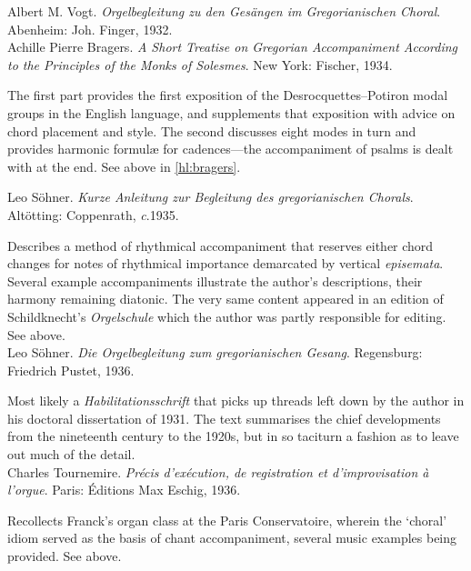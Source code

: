     \parindent=0pt
    \hangindent=0pt
  \covid{}Albert M. Vogt. \emph{Orgelbegleitung zu den Gesängen im Gregorianischen Choral}. Abenheim:  Joh. Finger, 1932. \\

    \parindent=0pt
    \hangindent=0pt
  Achille Pierre Bragers. \emph{A Short Treatise on Gregorian Accompaniment According to the Principles of the Monks of Solesmes}. New York:  Fischer, 1934.

     \parindent=20pt
     \hangindent=20pt
     The first part provides the first exposition of the Desrocquettes--Potiron modal groups in the English language, and supplements that exposition with advice on chord placement and style. The second discusses eight modes in turn and provides harmonic formul\ae{} for cadences---the accompaniment of psalms is dealt with at the end. See above in \cref{hl:bragers}.\\\pagebreak{}

    \parindent=0pt
    \hangindent=0pt
  Leo Söhner. \emph{Kurze Anleitung zur Begleitung des gregorianischen Chorals}. Altötting:  Coppenrath, \emph{c}.1935.

     \parindent=20pt
     \hangindent=20pt
     Describes a method of rhythmical accompaniment that reserves either chord changes for notes of rhythmical importance demarcated by vertical \emph{episemata}. Several example accompaniments illustrate the author's descriptions, their harmony remaining diatonic. The very same content appeared in an edition of Schildknecht's \emph{Orgelschule} which the author was partly responsible for editing. See  above.\\

    \parindent=0pt
    \hangindent=0pt
  Leo Söhner. \emph{Die Orgelbegleitung zum gregorianischen Gesang}. Regensburg:  Friedrich Pustet, 1936.

     \parindent=20pt
     \hangindent=20pt
     Most likely a \emph{Habilitationsschrift} that picks up threads left down by the author in his doctoral dissertation of 1931. The text summarises the chief developments from the nineteenth century to the 1920s, but in so taciturn a fashion as to leave out much of the detail.\\

    \parindent=0pt
    \hangindent=0pt
  \covid{}Charles Tournemire. \emph{Précis d'exécution, de registration et d'improvisation à l'orgue}. Paris:  Éditions Max Eschig, 1936.

     \parindent=20pt
     \hangindent=20pt
     Recollects Franck's organ class at the Paris Conservatoire, wherein the `choral' idiom served as the basis of chant accompaniment, several music examples being provided. See  above.\\


